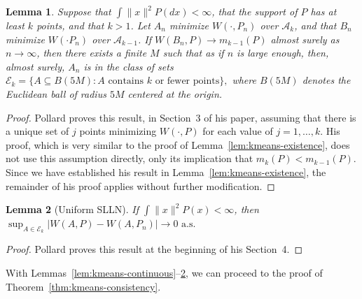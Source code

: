 \documentclass[11pt]{article}
\newtheorem{lemma}{Lemma}
\newcommand{\sA}{\mathcal{A}}
\newcommand{\sE}{\mathcal{E}}
\begin{document}
\begin{lemma}
\label{lem:pollard-compact}
Suppose that $\int \|x\|^2 P(dx) < \infty$, that the support of $P$ has at
least $k$ points, and that $k > 1$.  Let $A_n$ minimize $W(\cdot, P_n)$ over
$\sA_k$, and that $B_n$ minimize $W(\cdot P_n)$ over $\sA_{k-1}$.  If $W(B_n,
P) \to m_{k-1}(P)$ almost surely as $n \to \infty$, then there exists a finite
$M$ such that as if $n$ is large enough, then, almost surely, $A_n$ is in the
class of sets
\(
  \sE_k = \{ A \subseteq B(5M) : \text{$A$ contains $k$ or fewer points} \},
\)
where $B(5M)$ denotes the Euclidean ball of radius $5M$ centered at the
origin.
\end{lemma}
\begin{proof}
Pollard proves this result, in Section~3 of his paper,  assuming that there is
a unique set of $j$ points minimizing $W(\cdot, P)$ for each value of $j = 1,
\dotsc, k$.  His proof, which is very similar to the proof of
Lemma~\ref{lem:kmeans-existence}, does not use this assumption directly, only
its implication that $m_{k}(P) < m_{k-1}(P)$.  Since we have established his
result in Lemma~\ref{lem:kmeans-existence}, the remainder of his proof applies
without further modification.
\end{proof}


\begin{lemma}[Uniform SLLN]\label{lem:kmeans-uniform-slln}
If $\int \|x\|^2 P(x) < \infty$, then
\(
  \sup_{A \in \sE_k} |W(A, P) - W(A,P_n)| \to 0\text{ a.s.}
\)
\end{lemma}
\begin{proof}
Pollard proves this result at the beginning of his Section~4.
\end{proof}

With Lemmas~\ref{lem:kmeans-continuous}--\ref{lem:kmeans-uniform-slln}, we can
proceed to the proof of Theorem~\ref{thm:kmeans-consistency}.
\end{document}

